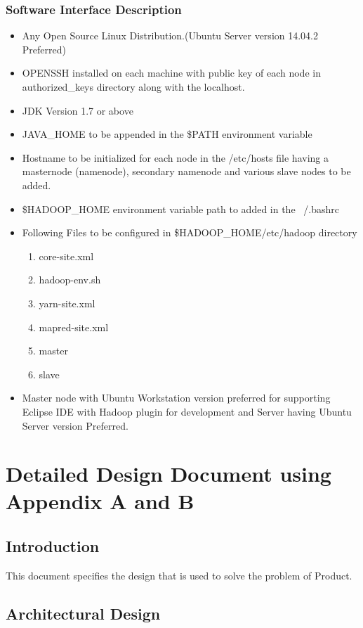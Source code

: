 \documentclass[oneside,a4paper,12pt]{report}
\begin{document}
 \subsection{Software Interface Description}	 
\begin{itemize}
\item Any Open Source Linux Distribution.(Ubuntu Server version 14.04.2 Preferred)
\item OPENSSH installed on each machine with public key of each node in authorized\_keys directory along with the localhost.
\item JDK Version 1.7 or above
\item JAVA\_HOME to be appended in the \$PATH environment variable
\item Hostname to be initialized for each node in the /etc/hosts file having a masternode (namenode), secondary namenode and various slave nodes to be added.
\item \$HADOOP\_HOME environment variable path to added in the ~/.bashrc 
\item Following Files to be configured in \$HADOOP\_HOME/etc/hadoop directory

	\begin{enumerate}
	\item core-site.xml
	\item hadoop-env.sh
	\item yarn-site.xml
	\item mapred-site.xml
	\item master
	\item slave
	\end{enumerate}

\item Master node with Ubuntu Workstation version preferred for supporting Eclipse IDE with Hadoop plugin for development and Server having Ubuntu Server version Preferred.
\end{itemize}



\chapter{Detailed Design Document using Appendix A and B}
 \section{Introduction}  
This document specifies the design that is used to solve the problem of Product.  

\section{Architectural Design}  
 
\end{document}

